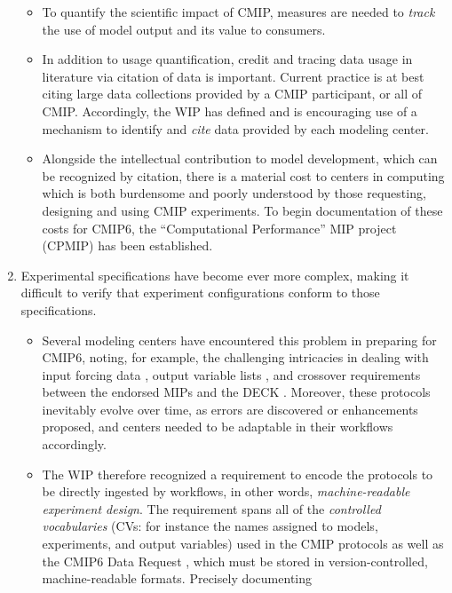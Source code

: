 \documentclass[gmd,manuscript]{copernicus}
\newcommand{\pipref}[1] {\citep{ref:#1}}
\begin{document}
\begin{enumerate}
  \begin{itemize}
  \item To quantify the scientific impact of CMIP, measures are needed
    to \emph{track} the use of model output and its value to consumers.
  \item In addition to usage quantification, credit and tracing data
    usage in literature via citation of data is important. Current
    practice is at best citing large data collections provided by a
    CMIP participant, or all of CMIP. Accordingly, the WIP has defined
    and is encouraging use of a mechanism to identify and \emph{cite}
    data provided by each modeling center.
  \item Alongside the intellectual contribution to model development,
    which can be recognized by citation, there is a material cost to
    centers in computing which is both burdensome and poorly
    understood by those requesting, designing and using CMIP
    experiments.  To begin documentation of these costs for CMIP6,
    the ``Computational Performance'' MIP
    project (CPMIP) \pipref{balajietal2017} has been established.
  \end{itemize}
\item\label{cmplx} Experimental specifications have become ever more
  complex, making it difficult to verify that experiment
  configurations conform to those specifications.
 \begin{itemize} 
 \item Several modeling centers have encountered this problem in
   preparing for CMIP6, noting, for example, the challenging
   intricacies in dealing with input forcing data
   \citep[see][]{ref:duracketal2017}, output variable lists
   \pipref{juckesetal2015}, and crossover requirements between the
   endorsed MIPs and the DECK \pipref{eyringetal2016a} . Moreover,
   these protocols inevitably evolve over time, as errors are
   discovered or enhancements proposed, and centers needed to be 
   adaptable in their workflows accordingly.
 \item The WIP therefore recognized a requirement to encode the
   protocols to be directly ingested by workflows, in other words,
   \emph{machine-readable experiment design}. The requirement spans
   all of the \emph{controlled vocabularies} (CVs: for instance the
   names assigned to models, experiments, and output variables) used
   in the CMIP protocols as well as the CMIP6 Data Request
   \pipref{juckesetal2015}, which must be stored in
   version-controlled, machine-readable formats. Precisely documenting

\end{itemize}
\end{enumerate}
\end{document}
